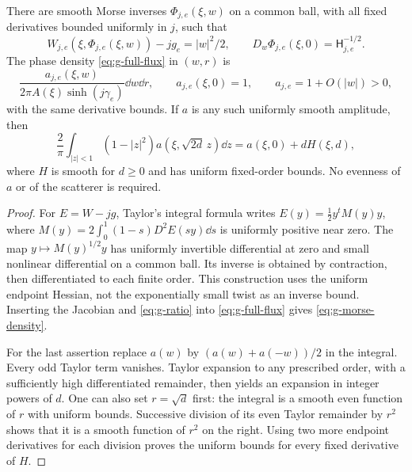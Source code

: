 \begin{lemma}\label{lem:g-radial}
There are smooth Morse inverses $\Phi_{j,e}(\xi,w)$ on a common ball,
with all fixed derivatives bounded uniformly in $j$, such that
\[
 W_{j,e}(\xi,\Phi_{j,e}(\xi,w))-jg_e=|w|^2/2,
 \qquad D_w\Phi_{j,e}(\xi,0)=\mathsf H_{j,e}^{-1/2}.
\]
The phase density \eqref{eq:g-full-flux} in $(w,r)$ is
\begin{equation}\label{eq:g-morse-density}
 \frac{a_{j,e}(\xi,w)}{2\pi A(\xi)\sinh(j\gamma_e)}\dd w\dd r,
 \qquad a_{j,e}(\xi,0)=1,
 \qquad a_{j,e}=1+O(|w|)>0,
\end{equation}
with the same derivative bounds. If $a$ is any such uniformly smooth
amplitude, then
\[
 \frac2\pi\int_{|z|<1}(1-|z|^2)a(\xi,\sqrt{2d}\,z)\dd z
            =a(\xi,0)+dH(\xi,d),
\]
where $H$ is smooth for $d\ge0$ and has uniform fixed-order bounds.
No evenness of $a$ or of the scatterer is required.
\end{lemma}
\begin{proof}
For $E=W-jg$, Taylor's integral formula writes
$E(y)=\frac12 y^tM(y)y$, where
$M(y)=2\int_0^1(1-s)D^2E(sy)\dd s$ is uniformly positive near zero.
The map $y\mapsto M(y)^{1/2}y$ has uniformly invertible differential at
zero and small nonlinear differential on a common ball. Its inverse is
obtained by contraction, then differentiated to each finite order.
This construction uses the uniform endpoint Hessian, not the exponentially small twist as an inverse bound. Inserting the
Jacobian and \eqref{eq:g-ratio} into \eqref{eq:g-full-flux} gives
\eqref{eq:g-morse-density}.

For the last assertion replace $a(w)$ by $(a(w)+a(-w))/2$ in the
integral. Every odd Taylor term vanishes. Taylor expansion to any
prescribed order, with a sufficiently high differentiated remainder,
then yields an expansion in integer powers of $d$. One can also set
$r=\sqrt d$ first: the integral is a smooth even function of $r$ with
uniform bounds. Successive division of its even Taylor remainder by
$r^2$ shows that it is a smooth function of $r^2$ on the right.
Using two more endpoint derivatives for each division proves the
uniform bounds for every fixed derivative of $H$.
\end{proof}

